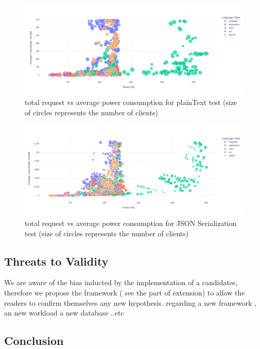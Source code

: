 \begin{figure}[hbt]
    \centering
    \includegraphics[width=
        \columnwidth]{imgs/power_requests_plaintext}
    \caption{total request vs average power consumption for plainText test (size of circles represents the number of clients)}
    \label{fig:power_requests_plaintext}
\end{figure}

\begin{figure}[hbt]
    \centering
    \includegraphics[width=
        \columnwidth]{imgs/power_requests_json}
    \caption{total request vs average power consumption for JSON Serialization test (size of circles represents the number of clients)}
    \label{fig:power_requests_json}
\end{figure}
\subsection{Threats to Validity}
We are aware of the bias inducted by the implementation of a candidates, therefore we propose  the framework ( see the part of extension) to allow the readers to confirm themselves any new hypothesis. regarding a new framework , an new workload a new database ..etc

\subsection{Conclusion}

